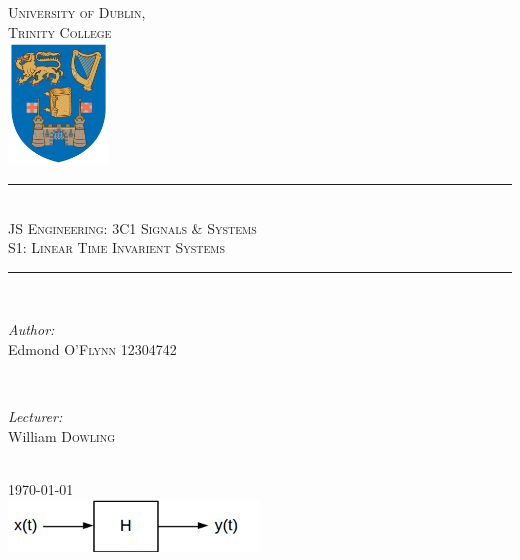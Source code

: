 \documentclass[12pt]{article}
\begin{document}
\begin{titlepage}

\newcommand{\HRule}{\rule{\linewidth}{0.5mm}}

\center
\textsc{\LARGE University of Dublin,\\Trinity College}\\[1.0cm]
\includegraphics[width=0.2\textwidth]{logo.png}

\HRule \\[0.4cm]
\textsc{\Large JS Engineering: 3C1 Signals \& Systems}\\[0.25cm]
\textsc{\large S1: Linear Time Invarient Systems}\\[0.1cm]
\HRule \\[0.4cm]
 
\begin{minipage}{0.5\textwidth}
\begin{flushleft} \large
\emph{Author:}
\\Edmond \textsc{O'Flynn} 12304742
\end{flushleft}
\end{minipage}
~
\begin{minipage}{0.4\textwidth}
\begin{flushleft} 
\large
\emph{Lecturer:} \\
William \textsc{Dowling} 
\end{flushleft}
\end{minipage}\\[6cm]

{\large \today}\\[2cm] 

\includegraphics[width=0.5\textwidth]{lti.png}
\clearpage
\end{titlepage}

\tableofcontents
{}
\thispagestyle{empty}
\cleardoublepage
\setcounter{page}{1}
\end{document}
